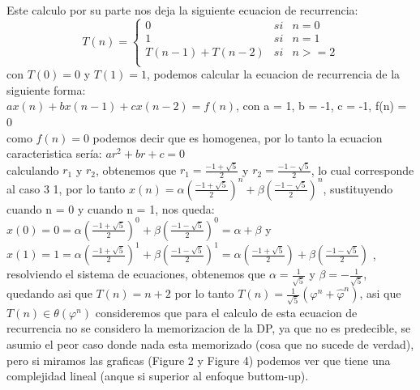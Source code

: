 \documentclass[spanish]{article}
\begin{document}
 	Este calculo por su parte nos deja la siguiente ecuacion de recurrencia:\\
 	\begin{equation}
 		T(n)= \left\{ \begin{array}{lcc}
 			0 &   si  & n = 0 \\
 			1 &   si  & n = 1 \\
 			T(n-1) +T(n-2) &  si &  n >= 2  \\
 		\end{array}
 		\right.
 	\end{equation}
 	con $T(0) = 0$ y $T(1) = 1$, podemos calcular la ecuacion de recurrencia de la siguiente forma:\\$		ax(n)+bx(n-1)+cx(n-2)=f(n)$, con a = 1, b = -1, c = -1, f(n) = 0\\
 	como $f(n)=0$ podemos decir que es homogenea, por lo tanto la ecuacion caracteristica sería: $ar^2+br+c=0$\\
 	calculando $r_1$ y $r_2$, obtenemos que $r_1=\frac{-1+\sqrt{5}}{2}$ y $r_2=\frac{-1-\sqrt{5}}{2}$, lo cual corresponde al caso 3
 	1, por lo tanto $x(n)=\alpha(\frac{-1+\sqrt{5}}{2})^n+\beta(\frac{-1-\sqrt{5}}{2})^n$, sustituyendo cuando n = 0 y cuando n = 1, nos queda: $x(0) = 0 = \alpha(\frac{-1+\sqrt{5}}{2})^0 + \beta(\frac{-1-\sqrt{5}}{2})^0 = \alpha + \beta$ y $x(1) = 1 = \alpha(\frac{-1+\sqrt{5}}{2})^1 + \beta(\frac{-1-\sqrt{5}}{2})^1 = \alpha(\frac{-1+\sqrt{5}}{2}) + \beta(\frac{-1-\sqrt{5}}{2})$
 	, resolviendo el sistema de ecuaciones, obtenemos que $\alpha=\frac{1}{\sqrt{5}}$ y $\beta=-\frac{1}{\sqrt{5}}$, quedando asi que $T(n) = n+2$ por lo tanto $T(n) = \frac{1}{\sqrt{5}}(\varphi^n + \hat{\varphi }^n)$, asi que $T(n)\in \theta(\varphi^n)$ consideremos que para el calculo de esta ecuacion de recurrencia no se considero la memorizacion de la DP, ya que no es predecible, se asumio el peor caso donde nada esta memorizado (cosa que no sucede de verdad), pero si miramos las graficas (Figure 2 y Figure 4) podemos ver que tiene una complejidad lineal (anque si superior al enfoque buttom-up).
\end{document}

